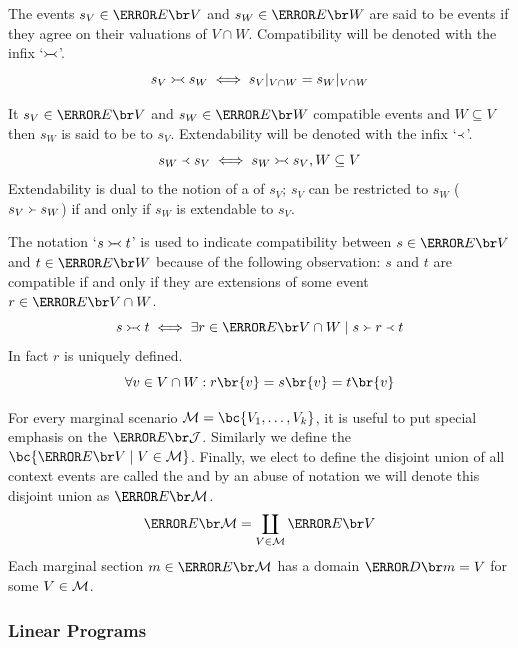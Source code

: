 \documentclass[aps, 10pt, english, twoside, pra, nofootinbib, longbibliography]{revtex4-1}
\begin{document}
    \begin{definition}
    \label{def:section_compatible}
    The events $s_{V} \in \Events{V}$ and $s_{W} \in \Events{W}$ are said to be  events if they agree on their valuations of $V \cap W$. Compatibility will be denoted with the infix `$\mathrel{\Yright\hspace{-0.2em}\Yleft}$'.
    \[ s_{V} \mathrel{\Yright\hspace{-0.2em}\Yleft} s_{W} \iff {s_{V}}|_{V\cap W} = {s_{W}}|_{V\cap W} \]
    \end{definition}
    \begin{definition}
    \label{def:section_extendable}
    It $s_V \in \Events{V}$ and $s_W \in \Events{W}$ compatible events and $W \subseteq V$ then $s_W$ is said to be  to $s_V$. Extendability will be denoted with the infix `$\mathrel{\Yleft}$'.
    \[ s_W \mathrel{\Yleft} s_V \iff s_W \mathrel{\Yright\hspace{-0.2em}\Yleft} s_V, W \subseteq V \]
    Extendability is dual to the notion of a  of $s_V$; $s_V$ can be restricted to $s_W$ ($s_V \mathrel{\Yright} s_W$) if and only if $s_W$ is extendable to $s_V$.
    \end{definition}

    \begin{remark}
        The notation `$s \mathrel{\Yright\hspace{-0.2em}\Yleft} t$' is used to indicate compatibility between $s \in \Events{V}$ and $t \in \Events{W}$ because of the following observation: $s$ and $t$ are compatible if and only if they are extensions of some event $r \in \Events{V \cap W}$.
        \[ s \com t \iff \exists r \in \Events{V \cap W} \mid s \res r \ext t \]
        In fact $r$ is uniquely defined.
        \[ \forall v \in V \cap W : r\br{v} = s\br{v} = t\br{v} \]
    \end{remark}

    For every marginal scenario $\mscenario = \bc{V_1, \ldots, V_k}$, it is useful to put special emphasis on the  $\Events{\jointvar}$. Similarly we define the  $\bc{\Events{V} \mid V \in \mscenario}$. Finally, we elect to define the disjoint union of all context events are called the  and by an abuse of notation we will denote this disjoint union as $\Events{\mscenario}$.
    \[ \Events{\mscenario} = \coprod_{V \in \mscenario} \Events{V} \]
    Each marginal section $m \in \Events{\mscenario}$ has a domain $\Dom{m} = V$ for some $V \in \mathcal{M}$.
    \subsubsection{Linear Programs}
    \label{sec:linear_programs}
\end{document}
